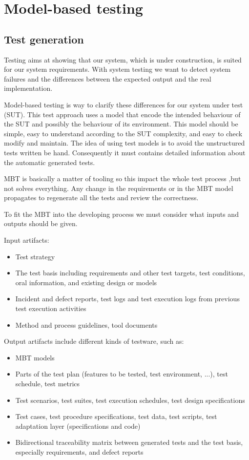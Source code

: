 \chapter{Model-based testing}
\section{Test generation}
Testing aims at showing that our system, which is under construction, is suited for our system requirements. With system testing we want to detect system failures and the differences between the expected output and the real implementation. 

Model-based testing is way to clarify these differences for our system under test (SUT). This test approach uses a model that encode the intended behaviour of the SUT and possibly the behaviour of its environment. This model should be simple, easy to understand according to the SUT complexity, and easy to check modify and maintain.
The idea of using test models is to avoid the unstructured tests written be hand. Consequently it must contains detailed information about the automatic generated tests. 

MBT is basically a matter of tooling so this impact the whole test process ,but not solves everything. Any change in the requirements or in the MBT model propagates to regenerate all the tests and review the correctness.

To fit the MBT into the developing process we must consider what inputs and outputs should be given.

Input artifacts:
\begin{itemize}
	\item Test strategy
	\item  The test basis including requirements and other test targets, test conditions, oral information, and 	existing design or models
	\item  Incident and defect reports, test logs and test execution logs from previous test execution activities
	\item  Method and process guidelines, tool documents
\end{itemize}
Output artifacts include different kinds of testware, such as:
\begin{itemize}
	\item  MBT models
	\item  Parts of the test plan (features to be tested, test environment, ...), test schedule, test metrics
	\item  Test scenarios, test suites, test execution schedules, test design specifications
	\item  Test cases, test procedure specifications, test data, test scripts, test adaptation layer (specifications and code)
	\item  Bidirectional traceability matrix between generated tests and the test basis, especially requirements, and defect reports
\end{itemize}

